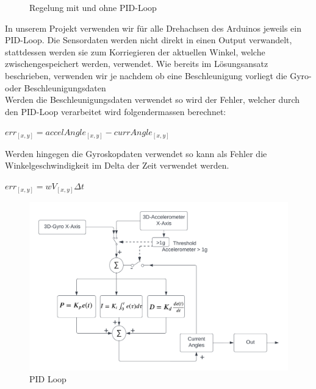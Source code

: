 \begin{figure}[H]
\centering
{}
  \caption{Regelung mit und ohne PID-Loop}
\end{figure}

In unserem Projekt verwenden wir für alle Drehachsen des Arduinos jeweils ein PID-Loop. 
Die Sensordaten werden nicht direkt in einen Output verwandelt, stattdessen werden sie zum Korriegieren der aktuellen Winkel, welche zwischengespeichert werden, verwendet.
Wie bereits im Lösungsansatz beschrieben, verwenden wir je nachdem ob eine Beschleunigung vorliegt die Gyro- oder Beschleunigungsdaten\\
Werden die Beschleunigungsdaten verwendet so wird der Fehler, welcher durch den PID-Loop verarbeitet wird folgendermassen berechnet:

\begin{math} err_[x,y] = accelAngle_[x,y] - currAngle_[x,y] \end{math}

Werden hingegen die Gyroskopdaten verwendet so kann als Fehler die Winkelgeschwindigkeit im Delta der Zeit verwendet werden.

\begin{math} err_[x,y] = wV_[x,y]\Delta{t}\end{math}



\begin{figure}[H]
  \begin{center}
    \includegraphics[width=1\linewidth]{content/images/PID_Loop.png}
    \caption{PID Loop}
  \end{center}
\end{figure}

